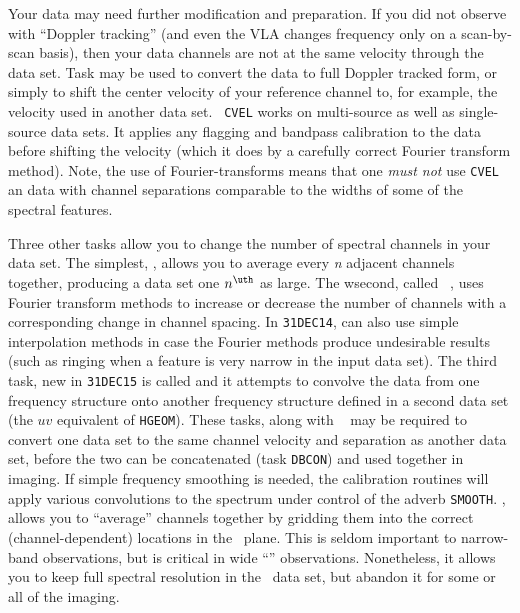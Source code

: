      Your  data may need further modification and
preparation.  If you did not observe with ``Doppler tracking'' (and
even the VLA changes frequency only on a scan-by-scan basis), then
your data channels are not at the same velocity through the data set.
Task {\tt {}} may be used to convert the data to full Doppler
tracked form, or simply to shift the center velocity of your reference
channel to, for example, the velocity used in another data set.  {\tt
CVEL} works on multi-source as well as single-source data sets.  It
applies any flagging and bandpass calibration to the data before
shifting the velocity (which it does by a carefully correct Fourier
transform method).  Note, the use of Fourier-transforms means that one
{\it must not} use {\tt CVEL} an data with channel separations
comparable to the widths of some of the spectral features.

     Three other tasks allow you to change the number of spectral
channels in your data set.  The simplest, {\tt {}}, allows
you to average every {\it n\/} adjacent channels together, producing a
data set one $n^{\uth}$ as large.  The wsecond, called {\tt
{}}, uses Fourier transform methods to increase or decrease
the number of channels with a corresponding change in channel spacing.
In {\tt 31DEC14}, {\tt {}} can also use simple interpolation
methods in case the Fourier methods produce undesirable results (such
as ringing when a feature is very narrow in the input data set).  The
third task, new in {\tt 31DEC15} is called {\tt {}} and it
attempts to convolve the data from one frequency structure onto
another frequency structure defined in a second data set (the $uv$
equivalent of {\tt HGEOM})\@.  These tasks, along with {\tt
{}} may be required to convert one data set to the same
channel velocity and separation as another data set, before the two
can be concatenated (task {\tt DBCON}) and used together in imaging.
If simple frequency smoothing is needed, the calibration routines will
apply various convolutions to the spectrum under control of the adverb
{\tt SMOOTH}\@.  {\tt {}}, allows you to ``average''
channels together by gridding them into the correct
(channel-dependent) locations in the \uv\ plane.  This is seldom
important to narrow-band observations, but is critical in wide
``'' observations.  Nonetheless, it allows
you to keep full spectral resolution in the \uv\ data set, but abandon
it for some or all of the imaging.

